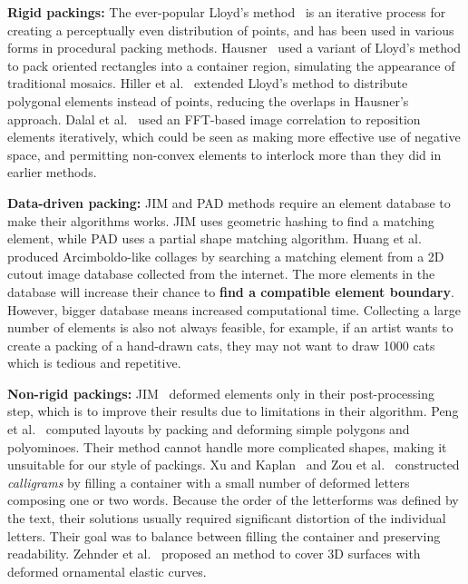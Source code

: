 
\textbf{Rigid packings:}
The ever-popular Lloyd's method~\cite{McCool1992}
is an iterative
process for creating a perceptually even distribution of points, and has been
used in various forms in procedural packing methods.
Hausner~\cite{Hausner2001} 
used a variant of Lloyd's method to pack oriented rectangles into a container 
region, simulating the appearance of traditional mosaics.  
Hiller et al.~\cite{Hiller2003} extended Lloyd's method to distribute polygonal
elements instead of points, reducing the overlaps in Hausner's approach.
Dalal et al.~\cite{Dalal2006} used an FFT-based image correlation to reposition
elements iteratively, which could be seen as making more effective use of negative
space, and permitting non-convex elements to interlock more than they did in
earlier methods.


\textbf{Data-driven packing:}
JIM and PAD methods require an element database to make their algorithms works.
JIM uses geometric hashing to find a matching element, 
while PAD uses a partial shape matching algorithm.
Huang et al.~\cite{Huang2011} produced Arcimboldo-like collages
by searching a matching element from a 2D cutout image database collected from the internet.  
The more elements in the database will increase their chance to \textbf{find a compatible element boundary}.
However, bigger database means increased computational time.
Collecting a large number of elements is also not always feasible,
for example, if an artist wants to create a packing of a hand-drawn cats,
they may not want to draw 1000 cats which is tedious and repetitive.

\textbf{Non-rigid packings:}
JIM~\cite{Kim2002} deformed elements
only in their post-processing step, which is to improve their results due to limitations in their algorithm.
Peng et al.~\cite{Peng2014} computed layouts by packing and deforming
simple polygons and polyominoes. Their method cannot handle more
complicated shapes, making it unsuitable for our style of packings.
Xu and Kaplan~\cite{Xu2007} and Zou et al.~\cite{Zou2016}
constructed \textit{calligrams} by filling a container with a small
number of deformed letters composing one or two words.  Because the
order of the letterforms was defined by the text, their solutions
usually required significant distortion of the individual letters.
Their goal was to balance between filling the container and preserving
readability.
Zehnder et al.~\cite{Zehnder2016} proposed an method to
cover 3D surfaces with deformed ornamental elastic curves.




